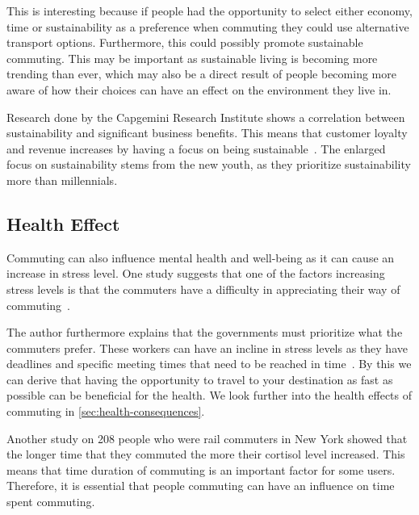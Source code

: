 This is interesting because if people had the opportunity to select either economy, time or sustainability as a
preference when commuting they could use alternative transport options.
Furthermore, this could possibly promote sustainable commuting.
This may be important as sustainable living is becoming more trending than ever, which may also be a direct result of
people becoming more aware of how their choices can have an effect on the environment they live in.

Research done by the Capgemini Research Institute shows a correlation between sustainability and significant business
benefits.
This means that customer loyalty and revenue increases by having a focus on being sustainable~\cite{capgemini2020}.
The enlarged focus on sustainability stems from the new youth, as they prioritize sustainability more than millennials.

\subsection{Health Effect}\label{subsec:health-effect}

Commuting can also influence mental health and well-being as it can cause an increase in stress level.
One study suggests that one of the factors increasing stress levels is that the commuters have a difficulty in
appreciating their way of commuting~\cite{koslowsky2013}.

The author furthermore explains that the governments must prioritize what the commuters prefer.
These workers can have an incline in stress levels as they have deadlines and specific meeting times that need to be
reached in time~\cite{koslowsky2013}.
By this we can derive that having the opportunity to travel to your destination as fast as possible can be beneficial
for the health.
We look further into the health effects of commuting in \ref{sec:health-consequences}.

Another study on 208 people who were rail commuters in New York showed that the longer time that they commuted the more
their cortisol level increased.
This means that time duration of commuting is an important factor for some users.
Therefore, it is essential that people commuting can have an influence on time spent commuting.


